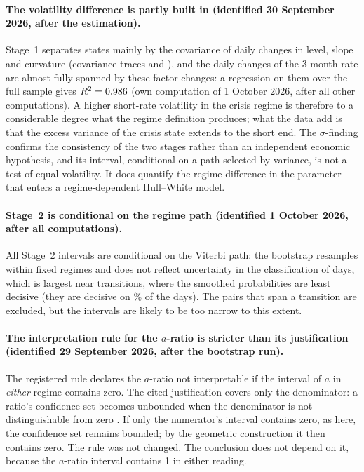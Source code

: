 \documentclass[11pt,a4paper]{article}
\begin{document}
\paragraph{The volatility difference is partly built in (identified 30 September 2026, after the estimation).} Stage~1 separates states mainly by the covariance of daily changes in level, slope and curvature (covariance traces \TrCalm{} and \TrCrisis{}), and the daily changes of the 3-month rate are almost fully spanned by these factor changes: a regression on them over the full sample gives $R^2=0.986$ (own computation of 1 October 2026, after all other computations). A higher short-rate volatility in the crisis regime is therefore to a considerable degree what the regime definition produces; what the data add is that the excess variance of the crisis state extends to the short end. The $\sigma$-finding confirms the consistency of the two stages rather than an independent economic hypothesis, and its interval, conditional on a path selected by variance, is not a test of equal volatility. It does quantify the regime difference in the parameter that enters a regime-dependent Hull--White model.

\paragraph{Stage~2 is conditional on the regime path (identified 1 October 2026, after all computations).} All Stage~2 intervals are conditional on the Viterbi path: the bootstrap resamples within fixed regimes and does not reflect uncertainty in the classification of days, which is largest near transitions, where the smoothed probabilities are least decisive (they are decisive on \Decisive\% of the days). The pairs that span a transition are excluded, but the intervals are likely to be too narrow to this extent.

\paragraph{The interpretation rule for the $a$-ratio is stricter than its justification (identified 29 September 2026, after the bootstrap run).} The registered rule declares the $a$-ratio not interpretable if the interval of $a$ in \emph{either} regime contains zero. The cited justification covers only the denominator: a ratio's confidence set becomes unbounded when the denominator is not distinguishable from zero \citep[p.~9]{franz2007}. If only the numerator's interval contains zero, as here, the confidence set remains bounded; by the geometric construction it then contains zero. The rule was not changed. The conclusion does not depend on it, because the $a$-ratio interval contains 1 in either reading.
\end{document}
